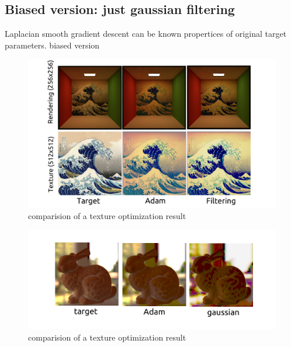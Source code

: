 \subsection*{Biased version: just gaussian filtering}

Laplacian smooth gradient descent can be known propertices of original target parameters. 
biased version

\begin{figure}[!h]
    \includegraphics[width=\textwidth]{figures/result-3.png}
    \caption{comparision of a texture optimization result}
    \label{fig:a-texture-comparision}
\end{figure}


\begin{figure}[!h]
    \includegraphics[width=\textwidth]{figures/result-4.png}
    \caption{comparision of a texture optimization result}
    \label{fig:a-texture-comparision}
\end{figure}

